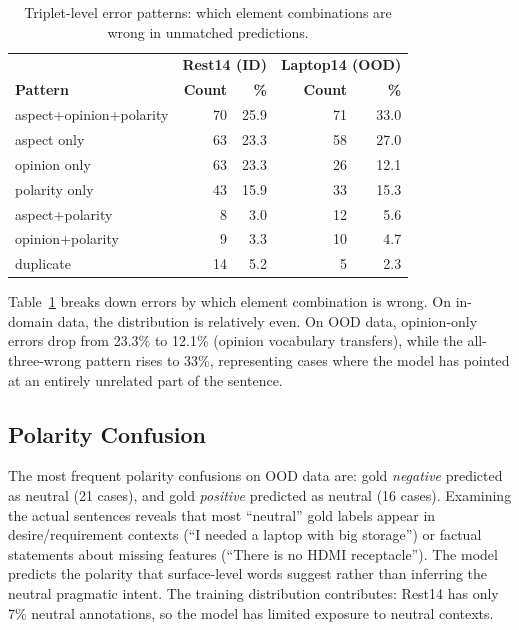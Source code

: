\documentclass[12pt,a4paper]{report}
\begin{document}
\begin{table}[H]
\centering
\caption{Triplet-level error patterns: which element combinations are wrong in unmatched predictions.}
\label{tab:errors-triplet}
\small
\begin{tabular}{@{}lrrrr@{}}
\toprule
& \multicolumn{2}{c}{\textbf{Rest14 (ID)}} & \multicolumn{2}{c}{\textbf{Laptop14 (OOD)}} \\
\textbf{Pattern} & \textbf{Count} & \textbf{\%} & \textbf{Count} & \textbf{\%} \\
\midrule
aspect+opinion+polarity & 70 & 25.9 & 71 & 33.0 \\
aspect only & 63 & 23.3 & 58 & 27.0 \\
opinion only & 63 & 23.3 & 26 & 12.1 \\
polarity only & 43 & 15.9 & 33 & 15.3 \\
aspect+polarity & 8 & 3.0 & 12 & 5.6 \\
opinion+polarity & 9 & 3.3 & 10 & 4.7 \\
duplicate & 14 & 5.2 & 5 & 2.3 \\
\bottomrule
\end{tabular}
\end{table}

Table~\ref{tab:errors-triplet} breaks down errors by which element combination is wrong. On in-domain data, the distribution is relatively even. On OOD data, opinion-only errors drop from 23.3\% to 12.1\% (opinion vocabulary transfers), while the all-three-wrong pattern rises to 33\%, representing cases where the model has pointed at an entirely unrelated part of the sentence.

\subsection{Polarity Confusion}

The most frequent polarity confusions on OOD data are: gold \textit{negative} predicted as neutral (21 cases), and gold \textit{positive} predicted as neutral (16 cases). Examining the actual sentences reveals that most ``neutral'' gold labels appear in desire/requirement contexts (``I needed a laptop with big storage'') or factual statements about missing features (``There is no HDMI receptacle''). The model predicts the polarity that surface-level words suggest rather than inferring the neutral pragmatic intent. The training distribution contributes: Rest14 has only 7\% neutral annotations, so the model has limited exposure to neutral contexts.
\end{document}
